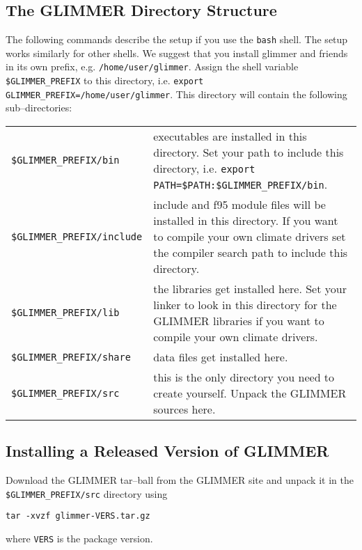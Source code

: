 \subsection{The GLIMMER Directory Structure}
The following commands describe the setup if you use the \texttt{bash} shell. The setup works similarly for other shells. We suggest that you install glimmer and friends in its own prefix, e.g. \texttt{/home/user/glimmer}. Assign the shell variable \texttt{\$GLIMMER\_PREFIX} to this directory, i.e. \texttt{export GLIMMER\_PREFIX=/home/user/glimmer}. This directory will contain the following sub--directories:
\begin{center}
 \begin{tabular}{lp{9.5cm}}
   \texttt{\$GLIMMER\_PREFIX/bin} & executables are installed in this directory. Set your path to include this directory, i.e. \texttt{export PATH=\$PATH:\$GLIMMER\_PREFIX/bin}.  \\
   \texttt{\$GLIMMER\_PREFIX/include} & include and f95 module files will be installed in this directory. If you want to compile your own climate drivers set the compiler search path to include this directory. \\
   \texttt{\$GLIMMER\_PREFIX/lib} & the libraries get installed here. Set your linker to look in this directory for the GLIMMER libraries if you want to compile your own climate drivers. \\
   \texttt{\$GLIMMER\_PREFIX/share} & data files get installed here.\\
   \texttt{\$GLIMMER\_PREFIX/src} & this is the only directory you need to create yourself. Unpack the GLIMMER sources here.
 \end{tabular}
\end{center}



\subsection{Installing a Released Version of GLIMMER}\label{ug.sec.tarball}
Download the GLIMMER tar--ball from the GLIMMER site and unpack it in the \texttt{\$GLIMMER\_PREFIX/src} directory using
\begin{verbatim}
tar -xvzf glimmer-VERS.tar.gz
\end{verbatim}
where \texttt{VERS} is the package version.

